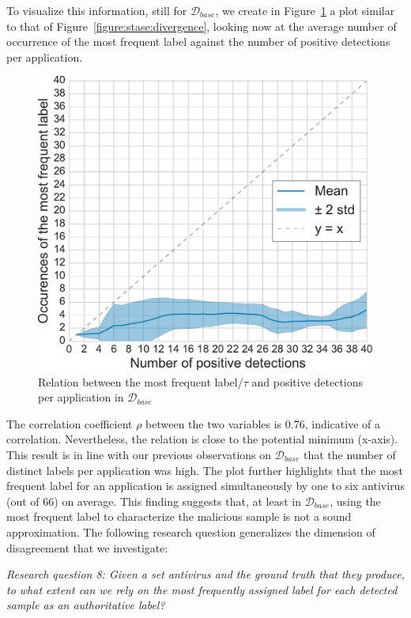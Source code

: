 To visualize this information, still for $\mathcal{D}_{base}$, we create in Figure~\ref{figure:stase:consensuality} a plot similar to that of Figure~\ref{figure:stase:divergence}, looking now at the average number of occurrence of the most frequent label against the number of positive detections per application.

\begin{figure}[!ht]
        \centering
	\includegraphics[width=0.75\linewidth]{figures/stase/consensuality.pdf}
        \caption[Relation between the most frequent label and positive detections per application]{Relation between the most frequent label/$\tau$ and positive detections per application in $\mathcal{D}_{base}$}
	\label{figure:stase:consensuality}
\end{figure}

The correlation coefficient $\rho$ between the two variables is $0.76$, indicative of a correlation.
Nevertheless, the relation is close to the potential minimum (x-axis).
This result is in line with our previous observations on $\mathcal{D}_{base}$ that the number of distinct labels per application was high.
The plot further highlights that the most frequent label for an application is assigned simultaneously by one to six antivirus (out of 66) on average.
This finding suggests that, at least in $\mathcal{D}_{base}$, using the most frequent label to characterize the malicious sample is not a sound approximation.
The following research question generalizes the dimension of disagreement that we investigate:

\begin{mdframed}[roundcorner=10pt,nobreak]
	{\em Research question 8: Given a set antivirus and the ground truth that they produce, to what extent can we rely on the most frequently assigned label for each detected sample as an authoritative label?}
\end{mdframed}

